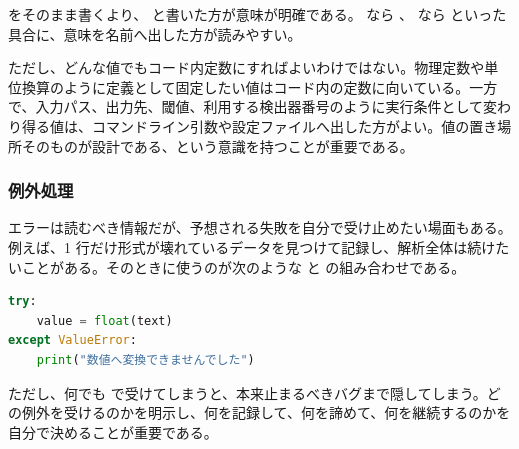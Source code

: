  をそのまま書くより、 と書いた方が意味が明確である。 なら 、 なら  といった具合に、意味を名前へ出した方が読みやすい。

ただし、どんな値でもコード内定数にすればよいわけではない。物理定数や単位換算のように定義として固定したい値はコード内の定数に向いている。一方で、入力パス、出力先、閾値、利用する検出器番号のように実行条件として変わり得る値は、コマンドライン引数や設定ファイルへ出した方がよい。値の置き場所そのものが設計である、という意識を持つことが重要である。

\subsubsection{例外処理}

エラーは読むべき情報だが、予想される失敗を自分で受け止めたい場面もある。例えば、1 行だけ形式が壊れているデータを見つけて記録し、解析全体は続けたいことがある。そのときに使うのが次のような  と  の組み合わせである。

\begin{lstlisting}[language=Python]
try:
    value = float(text)
except ValueError:
    print("数値へ変換できませんでした")
\end{lstlisting}

ただし、何でも  で受けてしまうと、本来止まるべきバグまで隠してしまう。どの例外を受けるのかを明示し、何を記録して、何を諦めて、何を継続するのかを自分で決めることが重要である。
